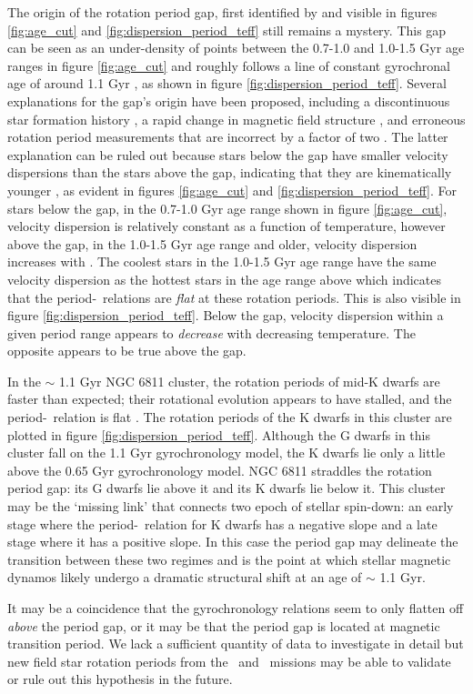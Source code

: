 The origin of the rotation period gap, first identified
by \citet{mcquillan2013} and visible in figures \ref{fig:age_cut} and
\ref{fig:dispersion_period_teff} still remains a mystery.
This gap can be seen as an under-density of points between the 0.7-1.0 and
1.0-1.5 Gyr age ranges in figure \ref{fig:age_cut} and roughly follows a line
of constant gyrochronal age of around 1.1 Gyr \citep[according to the
gyrochronology relation of][]{angus2019}, as shown in figure
\ref{fig:dispersion_period_teff}.
Several explanations for the gap's origin have been proposed, including a
discontinuous star formation history \citep{mcquillan2013, davenport2017,
davenport2018}, a rapid change in magnetic field structure
\citep{reinhold2019}, and erroneous rotation period measurements that are
incorrect by a factor of two \citep{koen2018}.
The latter explanation can be ruled out because stars below the gap have
smaller velocity dispersions than the stars above the gap, indicating that
they are kinematically younger \citep{mcquillan2013, davenport2018}, as
evident in figures \ref{fig:age_cut} and \ref{fig:dispersion_period_teff}.
For stars below the gap, in the 0.7-1.0 Gyr age range shown in figure
\ref{fig:age_cut}, velocity dispersion is relatively constant as a function of
temperature, however above the gap, in the 1.0-1.5 Gyr age range and older,
velocity dispersion increases with \teff.
The coolest stars in the 1.0-1.5 Gyr age range have the same velocity
dispersion as the hottest stars in the age range above which indicates that
the period-\teff\ relations are {\it flat} at these rotation periods.
This is also visible in figure \ref{fig:dispersion_period_teff}.
Below the gap, velocity dispersion within a given period range appears to {\it
decrease} with decreasing temperature.
The opposite appears to be true above the gap.

In the $\sim$ 1.1 Gyr NGC 6811 cluster, the rotation periods of mid-K dwarfs
are faster than expected; their rotational evolution appears to have stalled,
and the period-\teff\ relation is flat \citep{curtis2019}.
The rotation periods of the K dwarfs in this cluster are plotted in figure
\ref{fig:dispersion_period_teff}.
Although the G dwarfs in this cluster fall on the 1.1 Gyr gyrochronology
model, the K dwarfs lie only a little above the 0.65 Gyr gyrochronology model.
NGC 6811 straddles the rotation period gap: its G dwarfs lie above it and its
K dwarfs lie below it.
This cluster may be the `missing link' that connects two epoch of stellar
spin-down: an early stage where the period-\teff\ relation for K dwarfs has a
negative slope and a late stage where it has a positive slope.
In this case the period gap may delineate the transition between these two
regimes and is the point at which stellar magnetic dynamos likely undergo a
dramatic structural shift at an age of $\sim$ 1.1 Gyr.

It may be a coincidence that the gyrochronology relations seem to only flatten
off {\it above} the period gap, or it may be that the period gap is located at
magnetic transition period.
We lack a sufficient quantity of data to investigate in detail but new field
star rotation periods from the \ktwo\ and \tess\ missions may be able to
validate or rule out this hypothesis in the future.
